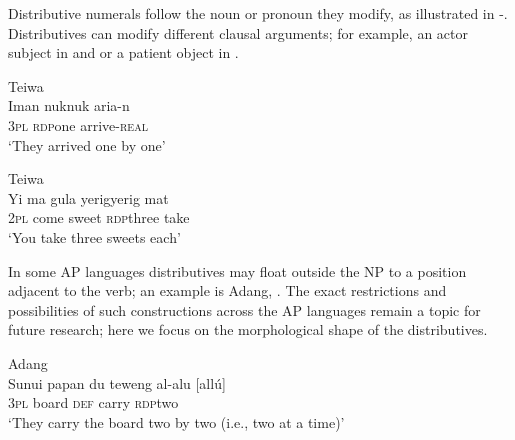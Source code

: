 Distributive numerals follow the noun or pronoun they modify, as illustrated in -. Distributives can modify different clausal arguments; for example, an actor subject in  and  or a patient object in .


\ea%
\label{bkm:Ref342655549}
{\upshape Teiwa}\\
\gll Iman  nuk\textit{{\Tilde}}nuk  aria-n\\  
    \textsc{3pl}   \textsc{rdp}\textit{{\Tilde}}one   arrive-\textsc{real}\\
\glt `They arrived one by one' 
\z

    

   

    
 

   

   

\ea%
\label{bkm:Ref342655553}
{\upshape Teiwa}\\
\gll Yi   ma   gula   yerig{\Tilde}yerig   mat\\  
     2\textsc{pl } come  sweet  \textsc{rdp}\textit{{\Tilde}}three  take \\
\glt `You take three sweets each'
\z

   

  

   

In some AP languages distributives may float outside the NP to a position adjacent to the verb; an example is Adang, . The exact restrictions and possibilities of such constructions across the AP languages remain a topic for future research; here we focus on the morphological shape of the distributives.


\ea
\label{ex:8:1235}
{\upshape Adang}\\
 \gll  Sunui{\textltailn}   papan   du   teweng al-alu  [all\'u]\\
   3\textsc{pl}    board  \textsc{def}   carry   \textsc{rdp}{\Tilde}two \\
 \glt `They carry the board two by two (i.e., two at a time)'
\z

